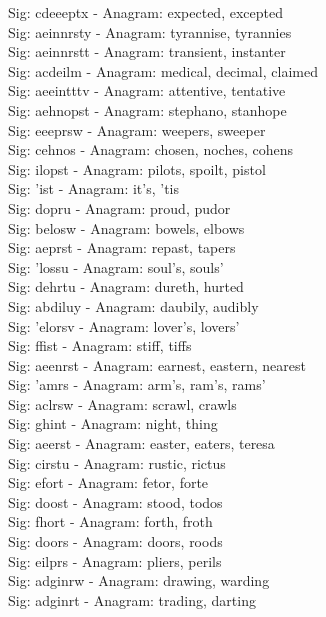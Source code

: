 Sig: {cdeeeptx} - Anagram: expected, excepted \\
Sig: {aeinnrsty} - Anagram: tyrannise, tyrannies \\
Sig: {aeinnrstt} - Anagram: transient, instanter \\
Sig: {acdeilm} - Anagram: medical, decimal, claimed \\
Sig: {aeeintttv} - Anagram: attentive, tentative \\
Sig: {aehnopst} - Anagram: stephano, stanhope \\
Sig: {eeeprsw} - Anagram: weepers, sweeper \\
Sig: {cehnos} - Anagram: chosen, noches, cohens \\
Sig: {ilopst} - Anagram: pilots, spoilt, pistol \\
Sig: {'ist} - Anagram: it's, 'tis \\
Sig: {dopru} - Anagram: proud, pudor \\
Sig: {belosw} - Anagram: bowels, elbows \\
Sig: {aeprst} - Anagram: repast, tapers \\
Sig: {'lossu} - Anagram: soul's, souls' \\
Sig: {dehrtu} - Anagram: dureth, hurted \\
Sig: {abdiluy} - Anagram: daubily, audibly \\
Sig: {'elorsv} - Anagram: lover's, lovers' \\
Sig: {ffist} - Anagram: stiff, tiffs \\
Sig: {aeenrst} - Anagram: earnest, eastern, nearest \\
Sig: {'amrs} - Anagram: arm's, ram's, rams' \\
Sig: {aclrsw} - Anagram: scrawl, crawls \\
Sig: {ghint} - Anagram: night, thing \\
Sig: {aeerst} - Anagram: easter, eaters, teresa \\
Sig: {cirstu} - Anagram: rustic, rictus \\
Sig: {efort} - Anagram: fetor, forte \\
Sig: {doost} - Anagram: stood, todos \\
Sig: {fhort} - Anagram: forth, froth \\
Sig: {doors} - Anagram: doors, roods \\
Sig: {eilprs} - Anagram: pliers, perils \\
Sig: {adginrw} - Anagram: drawing, warding \\
Sig: {adginrt} - Anagram: trading, darting \\
